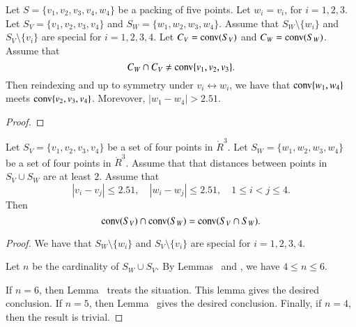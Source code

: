 \begin{tarskidata}
\begin{tarski}
\begin{lemma}
Let $S=\{v_1,v_2,v_3,v_4,w_4\}$ be a packing of five points.
Let $w_i=v_i$, for $i=1,2,3$.  Let $S_V=\{v_1,v_2,v_3,v_4\}$
and $S_W=\{w_1,w_2,w_3,w_4\}$. 
Assume that $S_W\setminus \{w_i\}$ and $S_V\setminus\{v_i\}$
are special for $i=1,2,3,4$.
 Let $C_V = {\operatorname{conv}}(S_V)$ and
$C_W={\operatorname{conv}}(S_W)$.  Assume that 
   $$
   C_W \cap C_V \ne {\operatorname{conv}}\{v_1,v_2,v_3\}.
   $$
Then reindexing and up to symmetry under $v_i\leftrightarrow w_i$,
we have that ${\operatorname{conv}}\{w_1,w_4\}$ meets ${\operatorname{conv}}\{v_2,v_3,v_4\}$.
Morevover, $|w_1-w_4|>2.51$.
\end{lemma}

\begin{proof}
\end{proof}
\end{tarski}






\begin{tarski}

\begin{lemma}
Let $S_V=\{v_1,v_2,v_3,v_4\}$ be a set of four
points in $\ring{R}^3$.  Let $S_W=\{w_1,w_2,w_3,w_4\}$ be a set
of four points in $\ring{R}^3$.  Assume that that distances
between points in $S_V\cup S_W$ are at least $2$.  Assume that
  $$
  |v_i-v_j|\le 2.51,\quad |w_i -w_j|\le 2.51,\quad 1\le i<j\le 4.
  $$
Then $${\operatorname{conv}}(S_V)\cap {\operatorname{conv}}(S_W) = {\operatorname{conv}}(S_V\cap S_W).$$
\end{lemma}

\begin{proof}
We have that $S_W\setminus\{w_i\}$ and $S_V\setminus\{v_i\}$ are
special for $i=1,2,3,4$.

Let $n$ be the cardinality of $S_W\cup S_V$.  By Lemmas~
and , we have $4\le n\le 6$.  

If $n=6$,
then Lemma~ treats the situation.  
This
lemma gives the desired conclusion.
If $n=5$, then Lemma~ gives the desired conclusion.
Finally, if $n=4$, then the result is trivial.
\end{proof}
\end{tarski}






\end{tarskidata}
